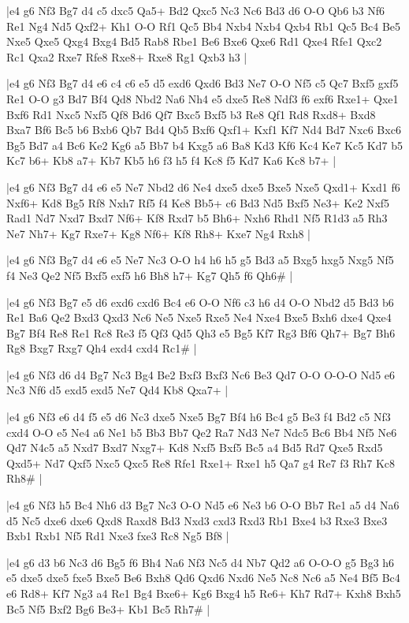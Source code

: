 \whitename{}
\blackname{}
\makegametitle
|e4 g6 Nf3 Bg7 d4 c5 dxc5 Qa5+ Bd2 Qxc5 Nc3 Nc6 Bd3 d6 O-O Qb6 b3 Nf6 Re1 Ng4 Nd5 Qxf2+ Kh1 O-O Rf1 Qc5 Bb4 Nxb4 Nxb4 Qxb4 Rb1 Qc5 Bc4 Be5 Nxe5 Qxe5 Qxg4 Bxg4 Bd5 Rab8 Rbe1 Be6 Bxe6 Qxe6 Rd1 Qxe4 Rfe1 Qxc2 Rc1 Qxa2 Rxe7 Rfe8 Rxe8+ Rxe8 Rg1 Qxb3 h3  |

\whitename{}
\blackname{}
\makegametitle
|e4 g6 Nf3 Bg7 d4 e6 c4 c6 e5 d5 exd6 Qxd6 Bd3 Ne7 O-O Nf5 c5 Qc7 Bxf5 gxf5 Re1 O-O g3 Bd7 Bf4 Qd8 Nbd2 Na6 Nh4 e5 dxe5 Re8 Ndf3 f6 exf6 Rxe1+ Qxe1 Bxf6 Rd1 Nxc5 Nxf5 Qf8 Bd6 Qf7 Bxc5 Bxf5 b3 Re8 Qf1 Rd8 Rxd8+ Bxd8 Bxa7 Bf6 Bc5 b6 Bxb6 Qb7 Bd4 Qb5 Bxf6 Qxf1+ Kxf1 Kf7 Nd4 Bd7 Nxc6 Bxc6 Bg5 Bd7 a4 Bc6 Ke2 Kg6 a5 Bb7 b4 Kxg5 a6 Ba8 Kd3 Kf6 Kc4 Ke7 Kc5 Kd7 b5 Kc7 b6+ Kb8 a7+ Kb7 Kb5 h6 f3 h5 f4 Kc8 f5 Kd7 Ka6 Kc8 b7+  |

\whitename{}
\blackname{}
\makegametitle
|e4 g6 Nf3 Bg7 d4 e6 e5 Ne7 Nbd2 d6 Ne4 dxe5 dxe5 Bxe5 Nxe5 Qxd1+ Kxd1 f6 Nxf6+ Kd8 Bg5 Rf8 Nxh7 Rf5 f4 Ke8 Bb5+ c6 Bd3 Nd5 Bxf5 Ne3+ Ke2 Nxf5 Rad1 Nd7 Nxd7 Bxd7 Nf6+ Kf8 Rxd7 b5 Bh6+ Nxh6 Rhd1 Nf5 R1d3 a5 Rh3 Ne7 Nh7+ Kg7 Rxe7+ Kg8 Nf6+ Kf8 Rh8+ Kxe7 Ng4 Rxh8  |

\whitename{}
\blackname{}
\makegametitle
|e4 g6 Nf3 Bg7 d4 e6 e5 Ne7 Nc3 O-O h4 h6 h5 g5 Bd3 a5 Bxg5 hxg5 Nxg5 Nf5 f4 Ne3 Qe2 Nf5 Bxf5 exf5 h6 Bh8 h7+ Kg7 Qh5 f6 Qh6\#  |

\whitename{}
\blackname{}
\makegametitle
|e4 g6 Nf3 Bg7 e5 d6 exd6 cxd6 Bc4 e6 O-O Nf6 c3 h6 d4 O-O Nbd2 d5 Bd3 b6 Re1 Ba6 Qe2 Bxd3 Qxd3 Nc6 Ne5 Nxe5 Rxe5 Ne4 Nxe4 Bxe5 Bxh6 dxe4 Qxe4 Bg7 Bf4 Re8 Re1 Rc8 Re3 f5 Qf3 Qd5 Qh3 e5 Bg5 Kf7 Rg3 Bf6 Qh7+ Bg7 Bh6 Rg8 Bxg7 Rxg7 Qh4 exd4 cxd4 Rc1\#  |

\whitename{}
\blackname{}
\makegametitle
|e4 g6 Nf3 d6 d4 Bg7 Nc3 Bg4 Be2 Bxf3 Bxf3 Nc6 Be3 Qd7 O-O O-O-O Nd5 e6 Nc3 Nf6 d5 exd5 exd5 Ne7 Qd4 Kb8 Qxa7+  |

\whitename{}
\blackname{}
\makegametitle
|e4 g6 Nf3 e6 d4 f5 e5 d6 Nc3 dxe5 Nxe5 Bg7 Bf4 h6 Bc4 g5 Be3 f4 Bd2 c5 Nf3 cxd4 O-O e5 Ne4 a6 Ne1 b5 Bb3 Bb7 Qe2 Ra7 Nd3 Ne7 Ndc5 Bc6 Bb4 Nf5 Ne6 Qd7 N4c5 a5 Nxd7 Bxd7 Nxg7+ Kd8 Nxf5 Bxf5 Bc5 a4 Bd5 Rd7 Qxe5 Rxd5 Qxd5+ Nd7 Qxf5 Nxc5 Qxc5 Re8 Rfe1 Rxe1+ Rxe1 h5 Qa7 g4 Re7 f3 Rh7 Kc8 Rh8\#  |

\whitename{}
\blackname{}
\makegametitle
|e4 g6 Nf3 h5 Bc4 Nh6 d3 Bg7 Nc3 O-O Nd5 e6 Ne3 b6 O-O Bb7 Re1 a5 d4 Na6 d5 Nc5 dxe6 dxe6 Qxd8 Raxd8 Bd3 Nxd3 cxd3 Rxd3 Rb1 Bxe4 b3 Rxe3 Bxe3 Bxb1 Rxb1 Nf5 Rd1 Nxe3 fxe3 Rc8 Ng5 Bf8  |

\whitename{}
\blackname{}
\makegametitle
|e4 g6 d3 b6 Nc3 d6 Bg5 f6 Bh4 Na6 Nf3 Nc5 d4 Nb7 Qd2 a6 O-O-O g5 Bg3 h6 e5 dxe5 dxe5 fxe5 Bxe5 Be6 Bxh8 Qd6 Qxd6 Nxd6 Ne5 Nc8 Nc6 a5 Ne4 Bf5 Bc4 e6 Rd8+ Kf7 Ng3 a4 Re1 Bg4 Bxe6+ Kg6 Bxg4 h5 Re6+ Kh7 Rd7+ Kxh8 Bxh5 Bc5 Nf5 Bxf2 Bg6 Be3+ Kb1 Bc5 Rh7\#  |

